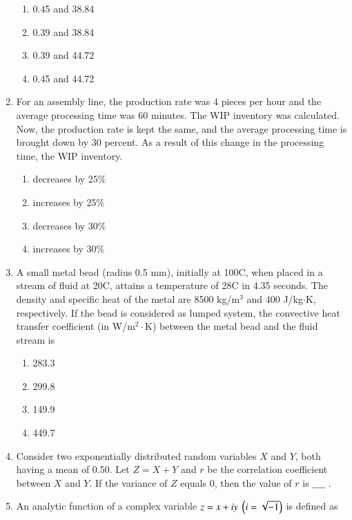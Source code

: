 \documentclass[journal]{IEEEtran}
\begin{document}
\begin{enumerate}
\begin{enumerate}
    \item 0.45 and 38.84
    \item 0.39 and 38.84
    \item 0.39 and 44.72
    \item 0.45 and 44.72 \\
\end{enumerate}
\item For an assembly line, the production rate was 4 pieces per hour and the average processing time was 60 minutes. The WIP inventory was calculated. Now, the production rate is kept the same, and the average processing time is brought down by 30 percent. As a result of this change in the processing time, the WIP inventory.
\begin{enumerate}
    \item decreases by 25\%
    \item increases by 25\%
    \item decreases by 30\%
    \item increases by 30\% \\
\end{enumerate}
\item A small metal bead (radius 0.5 mm), initially at 100\degree C, when placed in a stream of fluid at 20\degree C, attains a temperature of 28\degree C in 4.35 seconds. The density and specific heat of the metal are 8500 kg/$\text{m}^3$ and 400 J/kg$\cdot$K, respectively. If the bead is considered as lumped system, the convective heat transfer coefficient (in W/$\text{m}^2\cdot$K) between the metal bead and the fluid stream is
\begin{enumerate}
    \item 283.3
    \item 299.8
    \item 149.9
    \item 449.7 \\
\end{enumerate}
\item Consider two exponentially distributed random variables $X$ and $Y$, both having a mean of 0.50. Let $Z = X + Y$ and $r$ be the correlation coefficient between $X$ and $Y$. If the variance of $Z$ equals 0, then the
value of $r$ is $\_\_\_\_$ . \\
\item An analytic function of a complex variable $z = x + iy\ \left(i = \sqrt{-1}\right)$ is defined as 
\begin{align*}

\end{align*}
\end{enumerate}
\end{document}

